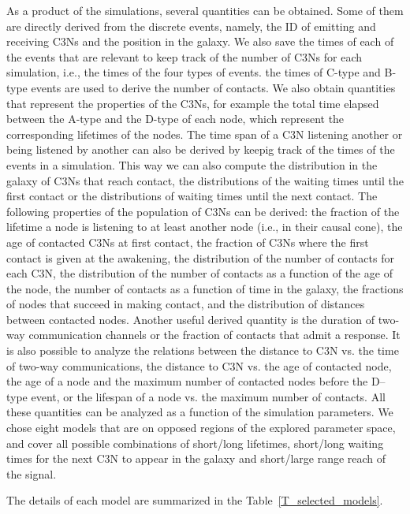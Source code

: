 \documentclass[crop]{CSLB}
\newcommand{\ceti}{C3N}
\newcommand{\cetis}{C3Ns}
\newcommand{\ttn}[1]{}
\begin{document}
As a product of the simulations, several quantities can be obtained.
%
Some of them are directly derived from the discrete events, namely,
the ID of emitting and receiving \cetis{} and the position in the
galaxy.
%
We also save the times of each of the events that are relevant to keep
track of the number of \cetis{} for each simulation, i.e., the times
of the four types of events.
%
the times of C-type and B-type events are used to derive the number of
contacts.
%
We also obtain quantities that represent the
properties of the \cetis{}, for example the total time elapsed between the
A-type and the D-type of each node, which represent the corresponding
lifetimes of the nodes.
%
The time span of a \ceti{} listening another or being listened by another
can also be derived by keepig track of the times of the events in a simulation.
%
This way we can also compute the distribution in the galaxy of
\cetis{}
that reach contact, the distributions of the waiting times until the 
first contact or the distributions of
waiting times until the next contact.
%
The following properties of the population of \cetis{} can be derived:
%
the fraction of the lifetime a node is listening
to
at least another node (i.e., in their causal cone),
%
the age of
contacted \cetis{} at first contact,
%
the fraction of \cetis{} where the first contact is
given at the awakening,
%
the distribution of the number of contacts for
each \ceti{},
%
the distribution of the number of contacts as a function of
the age of the node,
%
the number of contacts as a function of time in the galaxy,
%
the fractions of nodes that succeed in making contact,
%
and the distribution of
distances between contacted nodes.
%
Another useful derived quantity is the duration of two-way
communication channels or the fraction of contacts that admit a
response.
% 
It is also possible to analyze the relations between the distance to
\ceti{} vs. the time of two-way communications, the distance to \ceti{} vs. the
age of contacted node, the age of a node and the maximum number of
contacted nodes before the D--type event, or the lifespan of a node vs. the
maximum number of contacts.
%
All these quantities can be analyzed as a function of the
simulation parameters.
%
We chose eight models that are on opposed regions of the
explored parameter space, and cover
all possible combinations of 
short/long lifetimes, short/long
waiting times for the next \ceti{} to appear in the galaxy and short/large
range reach of the signal.
%
\ttn{2}
%
The details of each model are summarized in the
Table~\ref{T_selected_models}.
\end{document}
